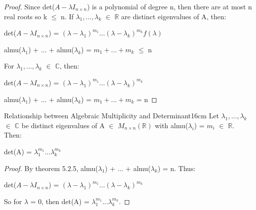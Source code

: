     \begin{proof}
        Since det($A - \lambda I_{n \times n}$) is a polynomial
        of degree n, then there are at most n real roots so k $\leq$ n.
        If $\lambda_1,...,\lambda_k$ $\in$ $\mathbb{R}$
        are distinct eigenvalues of A, then:

        \hspace{0.5cm}
        det($A - \lambda I_{n \times n}$)
        = $(\lambda - \lambda_1)^{m_1} ... (\lambda - \lambda_k)^{m_k} f(\lambda)$

        \hspace{0.5cm}
        almu($\lambda_1$) + ... + almu($\lambda_k$)
        = $m_1 + ... + m_k$
        $\leq$ n

        For $\lambda_1,...,\lambda_k$ $\in$ $\mathbb{C}$, then:

        \hspace{0.5cm}
        det($A - \lambda I_{n \times n}$)
        = $(\lambda - \lambda_1)^{m_1} ... (\lambda - \lambda_k)^{m_k}$

        \hspace{0.5cm}
        almu($\lambda_1$) + ... + almu($\lambda_k$)
        = $m_1 + ... + m_k$
        = n
    \end{proof}

    \newpage



    \begin{corollary}{Relationship between Algebraic Multiplicity
    and Determinant}{16cm}
        Let $\lambda_1,...,\lambda_k$ $\in$ $\mathbb{C}$ be distinct eigenvalues
        of A $\in$ $M_{n \times n}(\mathbb{R})$ with
        almu($\lambda_i$) = $m_i$ $\in$ $\mathbb{R}$.
        Then:

        \hspace{0.5cm}
        det(A) = $\lambda_1^{m_1}...\lambda_k^{m_k}$
    \end{corollary}

    \begin{proof}
        By {\color{red} theorem 5.2.5},
        almu($\lambda_1$) + ... + almu($\lambda_k$) = n. Thus:

        \hspace{0.5cm}
        det($A - \lambda I_{n \times n}$)
        = $(\lambda - \lambda_1)^{m_1} ... (\lambda - \lambda_k)^{m_k}$

        So for $\lambda$ = 0, then
        det(A) = $\lambda_1^{m_1}...\lambda_k^{m_k}$.
    \end{proof}

